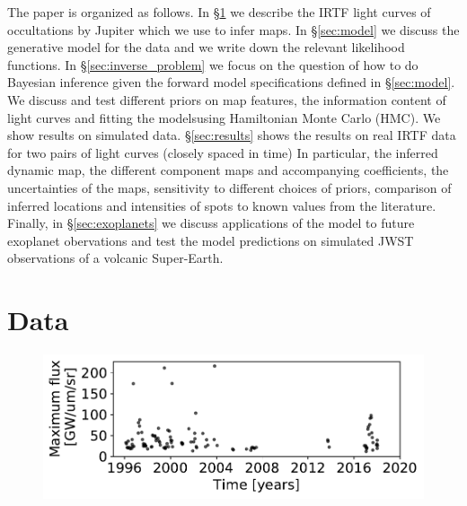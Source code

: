 \documentclass[modern]{aastex62}
\begin{document}
The paper is organized as follows.
In \S\ref{sec:data} we describe the IRTF light curves of occultations by Jupiter which we use to infer maps.
In \S\ref{sec:model} we discuss the generative model for the data and we write down the relevant likelihood functions.
In \S\ref{sec:inverse_problem} we focus on the question of how to do Bayesian inference given the forward model specifications defined in \S\ref{sec:model}.
We discuss and test different priors on map features, the information content of light curves and fitting the modelsusing Hamiltonian Monte Carlo (HMC). 
We show results on simulated data.
\S\ref{sec:results} shows the results on real IRTF data for two pairs of light curves (closely spaced in time)
In particular, the inferred dynamic map, the  different component maps and accompanying coefficients, the uncertainties of the maps, sensitivity to different choices of priors, comparison of inferred locations and intensities of spots to known values from the literature.
Finally, in \S\ref{sec:exoplanets} we discuss applications of the model to future exoplanet obervations and test the model predictions on simulated JWST observations of a volcanic Super-Earth.

\section{Data}
\label{sec:data}

\begin{figure}[h!]
    \begin{centering}
    \includegraphics[width=\linewidth]{figures/irtf_max_flux.pdf}
    \end{centering}
\end{figure}
\end{document}
